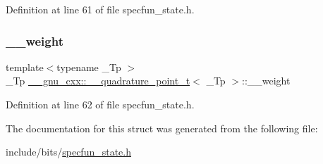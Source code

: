 Definition at line 61 of file specfun\+\_\+state.\+h.

\mbox{\label{struct____gnu__cxx_1_1____quadrature__point__t_a231e04e186e8e45b431876cc958a81c2}} 
\subsubsection{\texorpdfstring{\+\_\+\+\_\+weight}{\_\_weight}}
{\footnotesize\ttfamily template$<$typename \+\_\+\+Tp $>$ \\
\+\_\+\+Tp \hyperlink{struct____gnu__cxx_1_1____quadrature__point__t}{\+\_\+\+\_\+gnu\+\_\+cxx\+::\+\_\+\+\_\+quadrature\+\_\+point\+\_\+t}$<$ \+\_\+\+Tp $>$\+::\+\_\+\+\_\+weight}



Definition at line 62 of file specfun\+\_\+state.\+h.



The documentation for this struct was generated from the following file\+:\begin{DoxyCompactItemize}
\item 
include/bits/\hyperlink{specfun__state_8h}{specfun\+\_\+state.\+h}\end{DoxyCompactItemize}
